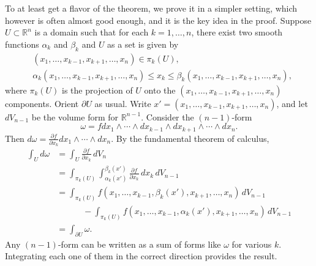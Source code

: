 \documentclass[12pt,openany]{book}
\newcommand{\R}{{\mathbb{R}}}
\theoremstyle{plain}
\theoremstyle{remark}
\theoremstyle{definition}
\theoremstyle{exercise}
\theoremstyle{example}
\begin{document}
To at least get a flavor of the theorem, we prove it in a simpler
setting, which however is often almost good enough, and it is the key idea
in the proof.
Suppose $U \subset \R^n$ is a domain such that for each $k=1,\ldots,n$,
there exist two smooth functions $\alpha_k$ and $\beta_k$ and $U$
as a set is given by
\begin{equation*}
\begin{aligned}
& (x_1,\ldots,x_{k-1},x_{k+1},\ldots,x_n) \in \pi_k(U) ,
\\
& \alpha_k(x_1,\ldots,x_{k-1},x_{k+1},\ldots,x_n)
\leq x_k \leq
\beta_k(x_1,\ldots,x_{k-1},x_{k+1},\ldots,x_n) ,
\end{aligned}
\end{equation*}
where $\pi_k(U)$ is the projection of $U$ onto the
$(x_1,\ldots,x_{k-1},x_{k+1},\ldots,x_n)$ components.
Orient $\partial U$ as usual.
Write $x' = (x_1,\ldots,x_{k-1},x_{k+1},\ldots,x_n)$, and let $dV_{n-1}$ be the
volume form for $\R^{n-1}$.
Consider the $(n-1)$-form
\begin{equation*}
\omega = f
dx_1 \wedge \cdots \wedge dx_{k-1} \wedge dx_{k+1} \wedge \cdots \wedge dx_n
.
\end{equation*}
Then $d\omega = \frac{\partial f}{\partial x_k} dx_1 \wedge \cdots \wedge
dx_n$.
By the fundamental theorem of
calculus,
\begin{equation*}
\begin{split}
\int_U d\omega &=
\int_U \frac{\partial f}{\partial x_k} \, dV_n
\\
& =
\int_{\pi_k(U)}
\int_{\alpha_k(x')}^{\beta_k(x')}
\frac{\partial f}{\partial x_k} \, dx_k \, dV_{n-1}
\\
& =
\int_{\pi_k(U)}
f(x_1,\ldots,x_{k-1}, \beta_k(x'), x_{k+1}, \ldots, x_n)
\,dV_{n-1}
\\
& \phantom{=xxx}
-
\int_{\pi_k(U)}
f(x_1,\ldots,x_{k-1}, \alpha_k(x'), x_{k+1}, \ldots, x_n)
\,dV_{n-1}
\\
& =
\int_{\partial U} \omega .
\end{split}
\end{equation*}
Any $(n-1)$-form can be written as a sum of forms like $\omega$ for various
$k$.  Integrating each one of them in the correct direction provides the
result.

\end{document}
